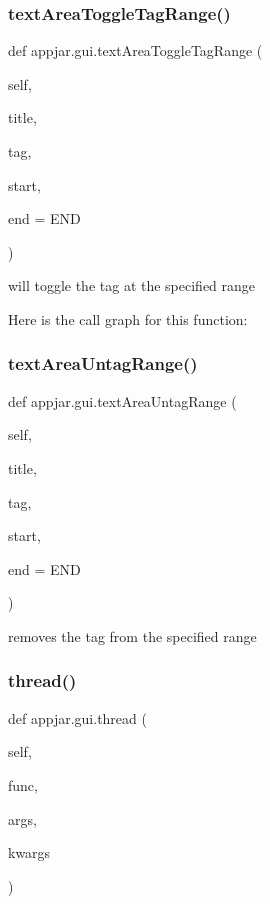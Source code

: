 \begin{DoxyVerb}
\subsubsection{\texorpdfstring{text\+Area\+Toggle\+Tag\+Range()}{textAreaToggleTagRange()}}
{\footnotesize\ttfamily def appjar.\+gui.\+text\+Area\+Toggle\+Tag\+Range (\begin{DoxyParamCaption}\item[{}]{self,  }\item[{}]{title,  }\item[{}]{tag,  }\item[{}]{start,  }\item[{}]{end = {\ttfamily END} }\end{DoxyParamCaption})}

\begin{DoxyVerb}will toggle the tag at the specified range \end{DoxyVerb}
 Here is the call graph for this function\+:
\mbox{\label{classappjar_1_1gui_ab9439f8833281ad740d3e16adf0ca660}} 
\subsubsection{\texorpdfstring{text\+Area\+Untag\+Range()}{textAreaUntagRange()}}
{\footnotesize\ttfamily def appjar.\+gui.\+text\+Area\+Untag\+Range (\begin{DoxyParamCaption}\item[{}]{self,  }\item[{}]{title,  }\item[{}]{tag,  }\item[{}]{start,  }\item[{}]{end = {\ttfamily END} }\end{DoxyParamCaption})}

\begin{DoxyVerb}removes the tag from the specified range \end{DoxyVerb}
 \mbox{\label{classappjar_1_1gui_ad03085938c4f3620081998cbea2aaa5e}} 
\subsubsection{\texorpdfstring{thread()}{thread()}}
{\footnotesize\ttfamily def appjar.\+gui.\+thread (\begin{DoxyParamCaption}\item[{}]{self,  }\item[{}]{func,  }\item[{}]{args,  }\item[{}]{kwargs }\end{DoxyParamCaption})}


\end{DoxyVerb}
